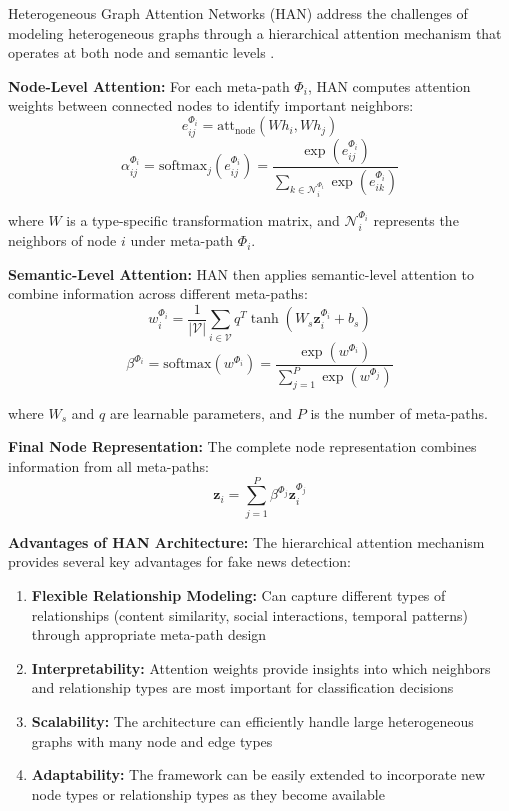 Heterogeneous Graph Attention Networks (HAN) address the challenges of modeling heterogeneous graphs through a hierarchical attention mechanism that operates at both node and semantic levels \cite{wang2019han}.

\textbf{Node-Level Attention:} For each meta-path $\Phi_i$, HAN computes attention weights between connected nodes to identify important neighbors:
\begin{equation}
e_{ij}^{\Phi_i} = \text{att}_{\text{node}}(Wh_i, Wh_j)
\end{equation}
\begin{equation}
\alpha_{ij}^{\Phi_i} = \text{softmax}_j(e_{ij}^{\Phi_i}) = \frac{\exp(e_{ij}^{\Phi_i})}{\sum_{k \in \mathcal{N}_i^{\Phi_i}} \exp(e_{ik}^{\Phi_i})}
\end{equation}

where $W$ is a type-specific transformation matrix, and $\mathcal{N}_i^{\Phi_i}$ represents the neighbors of node $i$ under meta-path $\Phi_i$.

\textbf{Semantic-Level Attention:} HAN then applies semantic-level attention to combine information across different meta-paths:
\begin{equation}
w_i^{\Phi_i} = \frac{1}{|\mathcal{V}|} \sum_{i \in \mathcal{V}} q^T \tanh(W_s \mathbf{z}_i^{\Phi_i} + b_s)
\end{equation}
\begin{equation}
\beta^{\Phi_i} = \text{softmax}(w^{\Phi_i}) = \frac{\exp(w^{\Phi_i})}{\sum_{j=1}^P \exp(w^{\Phi_j})}
\end{equation}

where $W_s$ and $q$ are learnable parameters, and $P$ is the number of meta-paths.

\textbf{Final Node Representation:} The complete node representation combines information from all meta-paths:
\begin{equation}
\mathbf{z}_i = \sum_{j=1}^P \beta^{\Phi_j} \mathbf{z}_i^{\Phi_j}
\end{equation}

\textbf{Advantages of HAN Architecture:} The hierarchical attention mechanism provides several key advantages for fake news detection:
\begin{enumerate}
\item \textbf{Flexible Relationship Modeling:} Can capture different types of relationships (content similarity, social interactions, temporal patterns) through appropriate meta-path design
\item \textbf{Interpretability:} Attention weights provide insights into which neighbors and relationship types are most important for classification decisions  
\item \textbf{Scalability:} The architecture can efficiently handle large heterogeneous graphs with many node and edge types
\item \textbf{Adaptability:} The framework can be easily extended to incorporate new node types or relationship types as they become available
\end{enumerate}

